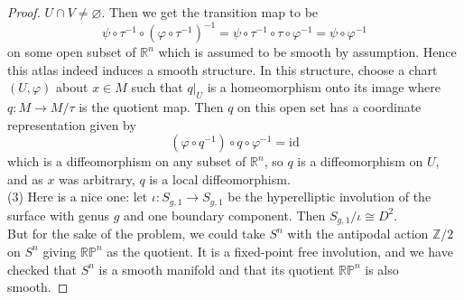 \documentclass[reqno]{amsart}
\theoremstyle{definition}
\theoremstyle{remark}
\newcommand{\id}{{\mathrm{id}}}
\begin{document}
\begin{proof}
         $U \cap V \neq \varnothing$.
         Then we get
         the transition map to be
          \[
         \psi \circ \tau^{-1} \circ \left( \varphi \circ
         \tau^{-1} \right)^{-1}
         = \psi  \circ \tau^{-1} \circ \tau \circ
         \varphi^{-1}
         = \psi \circ \varphi^{-1}
         \] 
         on some open subset of $\mathbb{R}^{n}$ which
         is assumed to be smooth by assumption. Hence
         this atlas indeed induces a smooth structure. 
         In this structure, choose a chart
          $\left( U, \varphi  \right) $ 
          about $x \in M$ such that
          $q|_{U}$ is a homeomorphism onto its image
          where $q \colon M \to M / \tau$ is the quotient map.
          Then $q$ on this open set has a coordinate
          representation given by
          \[
          \left( \varphi 
          \circ q^{-1} \right)  \circ q \circ \varphi^{-1}
          = \id
          \] 
          which is a diffeomorphism on any subset of
          $\mathbb{R}^{n}$, so
          $q$ is a diffeomorphism on $U$, and as
          $x$ was arbitrary, $q$ is a local
          diffeomorphism.\\
          \linebreak
          (3) Here is a nice one: let
          $\iota \colon S_{g,1} \to S_{g,1}$ be the
          hyperelliptic involution of the surface with
          genus $g$ and one boundary component. Then
          $S_{g,1} / \iota \cong
          D^2$.\\
          \linebreak
          But for the sake of the problem, 
          we could take $S^{n}$ with the
          antipodal action $\mathbb{Z}/2$ on
          $S^{n}$ giving $\mathbb{R}\mathbb{P}^{n}$ as
          the quotient. It is a fixed-point free
          involution, and we have checked that
          $S^{n}$ is a smooth manifold and that
          its quotient $\mathbb{R}\mathbb{P}^{n}$ is
          also smooth.

     \end{proof}
\end{document}
